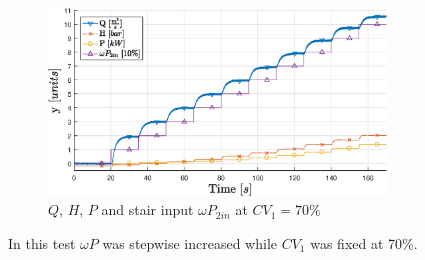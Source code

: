 \begin{figure}[H]
	\centering
	\includegraphics[width=0.8\textwidth]{figures/04ExperimentsAndLabWork/testrun.eps}
	\caption{$Q$, $H$, $P$ and stair input $\omega P_{2in}$ at $CV_1 = 70\%$}
	\label{fig:testrun}
\end{figure}
In this test $\omega P$ was stepwise increased while $CV_1$ was fixed at 70\%.
